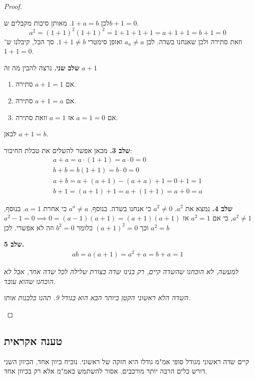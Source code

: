 \documentclass[]{article}
\begin{document}
\begin{proof}
\begin{multicols}{2}
			לכן $1 + a = b$. מאותן סיבות מקבלים ש‏$b + 1 = 0$. 
			\[ a^2 = (1 + 1)^2(1 + 1)^2 = 1 + 1 + 1 + 1 = a + 1 + 1 = b + 1 = 0 \]
			וזאת סתירה ולכן שאנחנו בשדה. לכן $a _ a \neq a$ ואופן סימטרי $1 + 1 \neq b$. סך הכל, קיבלנו ש־$1 + 1 = 0$. 
			
			\textbf{שלב שני. }נרצה להבין מה זה $a + 1$
			\begin{enumerate}
				\item אם $a + 1 = 1 $ סתירה. 
				\item אם $a + 1 = a $ סתירה. 
				\item אם $a = 1 = 0$ אז $a = 1$ וזאת סתירה. 
			\end{enumerate}
			לכאן $a + 1 = b$. 
			
			\textbf{שלב 3. }מכאן אפשר להשלים את טבלת החיבור: 
			\begin{gather*}
				a + a  = a \cdot (1 +1 ) = a \cdot 0 = 0 \\ b + b = b (1 + 1) = b \cdot 0 = 0 \\
				a + b = a + (a + 1) - (a +a) + 1 = 0 + 1 = 1 \\ b + 1 = (a + 1) + 1 = a + (1 + 1) = a + 0 = a
			\end{gather*}
			
			\textbf{שלב 4. }נמצא את $a^2$. $a^2 \neq 0$ כי אנחנו בשדה. בנוסף, $a^a \neq a$ כי אחרת $a =1 $. בנוסף, $a^2 \neq 1$, כי אם $a^2 = 1$ אז $a^2 -1 = 0 \implies 0 = (a - 1)(a + 1) = (a + 1)(a + 1)$ וכך $(a + 1)^2 = 0$ כלומר $b^2 = 0$ וזה לא אפשרי. לכן $a^2 = b$
			
			\textbf{שלב 5. }
			\begin{gather}
				ab = a(a + 1) = a^2 + a = b + a = 1
			\end{gather}
			
					\textit{למעשה, לא הוכחנו שהשדה קיים, רק בנינו שדה בצורת שלילה לכל שדה אחר, אבל לא הוכחנו שהוא עובד. }
			
			\textit{השדה הלא ראשוני הקטן ביותר הבא הוא בגודל 9. תהנו בלבנות אותו. }
		\end{multicols}
		

	\end{proof}
	
	\subsection{טענה אקראית}
	קיים שדה ראשוני מגודל סופי אמ"מ גודלו היא חזקה של ראשוני. נוכיח כיוון אחד, הכיוון השני דורש כלים הרבה יותר מורכבים. אסור להשתמש באמ"מ אלא רק בכיוון אחד. 
	
\end{document}
